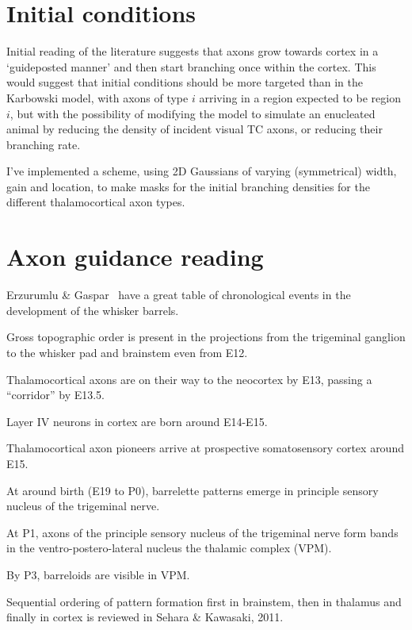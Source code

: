 \documentclass[11pt, a4paper]{article}
\begin{document}
\section{Initial conditions}

Initial reading of the literature suggests that axons grow towards
cortex in a `guideposted manner' and then start branching once within
the cortex. This would suggest that initial conditions should be more
targeted than in the Karbowski model, with axons of type $i$ arriving
in a region expected to be region $i$, but with the possibility of
modifying the model to simulate an enucleated animal by reducing the
density of incident visual TC axons, or reducing their branching rate.

I've implemented a scheme, using 2D Gaussians of varying (symmetrical)
width, gain and location, to make masks for the initial branching
densities for the different thalamocortical axon types.

\section{Axon guidance reading}

Erzurumlu \& Gaspar~\cite{erzurumlu_development_2012} have a great
table of chronological events in the development of the whisker
barrels.

Gross topographic order is present in the projections from the
trigeminal ganglion to the whisker pad and brainstem even from E12.

Thalamocortical axons are on their way to the neocortex by E13,
passing a ``corridor'' by E13.5.

Layer IV neurons in cortex are born around E14-E15.

Thalamocortical axon pioneers arrive at prospective somatosensory
cortex around E15.

At around birth (E19 to P0), barrelette patterns emerge in principle
sensory nucleus of the trigeminal nerve.

At P1, axons of the principle sensory nucleus of the trigeminal nerve
form bands in the ventro-postero-lateral nucleus the thalamic complex
(VPM).

By P3, barreloids are visible in VPM.

Sequential ordering of pattern formation first in brainstem, then in
thalamus and finally in cortex is reviewed in Sehara \& Kawasaki, 2011.
\end{document}
